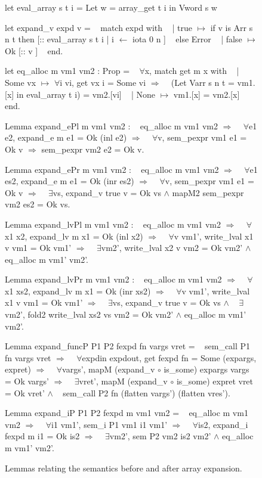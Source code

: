 \documentclass{article}
\begin{document}
\begin{figure}[p]
\obeylines\obeyspaces\ttfamily%
let eval\_array s t i = Let w = array\_get t i in Vword s w

let expand\_v expd v =
~ match expd with
~ | true  \(\mapsto\) if v is Arr s n t then [:: eval\_array s t i | i \(\leftarrow\) iota 0 n ]
~   else Error
~ | false \(\mapsto\) Ok [:: v ]
~ end.

let eq\_alloc m vm1 vm2 : Prop =
~ \(\forall\)x, match get m x with
~ | Some vx \(\mapsto\) \(\forall\)i vi, get vx i = Some vi \(\Longrightarrow\)
~   (Let Varr s n t = vm1.[x] in eval\_array t i) = vm2.[vi]
~ | None \(\mapsto\) vm1.[x] = vm2.[x]
~ end.

Lemma expand\_ePl m vm1 vm2 :
~ eq\_alloc m vm1 vm2 \(\Longrightarrow\)
~ \(\forall\)e1 e2, expand\_e m e1 = Ok (inl e2) \(\Longrightarrow\)
~ \(\forall\)v, sem\_pexpr vm1 e1 = Ok v \(\Longrightarrow\) sem\_pexpr vm2 e2 = Ok v.

Lemma expand\_ePr m vm1 vm2 :
~ eq\_alloc m vm1 vm2 \(\Longrightarrow\)
~ \(\forall\)e1 es2, expand\_e m e1 = Ok (inr es2) \(\Longrightarrow\)
~ \(\forall\)v, sem\_pexpr vm1 e1 = Ok v \(\Longrightarrow\)
~ \(\exists\)vs, expand\_v true v = Ok vs \(\wedge\) mapM2 sem\_pexpr vm2 es2 = Ok vs.

Lemma expand\_lvPl m vm1 vm2 :
~ eq\_alloc m vm1 vm2 \(\Longrightarrow\)
~ \(\forall\)x1 x2, expand\_lv m x1 = Ok (inl x2) \(\Longrightarrow\)
~ \(\forall\)v vm1', write\_lval x1 v vm1 = Ok vm1' \(\Longrightarrow\)
~ \(\exists\)vm2', write\_lval x2 v vm2 = Ok vm2' \(\wedge\) eq\_alloc m vm1' vm2'.

Lemma expand\_lvPr m vm1 vm2 :
~ eq\_alloc m vm1 vm2 \(\Longrightarrow\)
~ \(\forall\)x1 xs2, expand\_lv m x1 = Ok (inr xs2) \(\Longrightarrow\)
~ \(\forall\)v vm1', write\_lval x1 v vm1 = Ok vm1' \(\Longrightarrow\)
~ \(\exists\)vs, expand\_v true v = Ok vs \(\wedge\)
~   \(\exists\)vm2', fold2 write\_lval xs2 vs vm2 = Ok vm2' \(\wedge\) eq\_alloc m vm1' vm2'.

Lemma expand\_funcP P1 P2 fexpd fn vargs vret =
~ sem\_call P1 fn vargs vret \(\Longrightarrow\)
~ \(\forall\)expdin expdout, get fexpd fn = Some (expargs, expret) \(\Longrightarrow\)
~ \(\forall\)vargs', mapM (expand\_v \(\circ\) is\_some) expargs vargs = Ok vargs' \(\Longrightarrow\)
~ \(\exists\)vret',  mapM (expand\_v \(\circ\) is\_some) expret  vret  = Ok vret'  \(\wedge\)
~   sem\_call P2 fn (flatten vargs') (flatten vres').

Lemma expand\_iP P1 P2 fexpd m vm1 vm2 =
~ eq\_alloc m vm1 vm2 \(\Longrightarrow\)
~ \(\forall\)i1 vm1', sem\_i P1 vm1 i1 vm1' \(\Longrightarrow\)
~ \(\forall\)is2, expand\_i fexpd m i1 = Ok is2 \(\Longrightarrow\)
~ \(\exists\)vm2', sem P2 vm2 is2 vm2' \(\wedge\) eq\_alloc m vm1' vm2'.
\normalfont%
\caption{Lemmas relating the semantics before and after array expansion.}
\end{figure}
\end{document}
